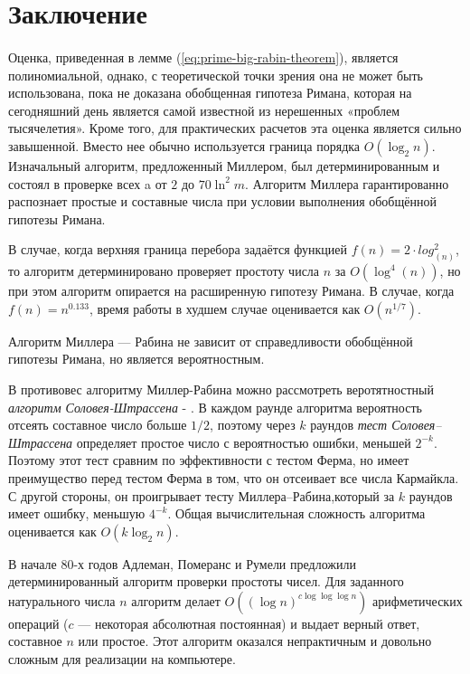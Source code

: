 \section{Заключение}

\paragraph{} Оценка, приведенная в лемме (\ref{eq:prime-big-rabin-theorem}), является полиномиальной, однако, с теоретической точки зрения она не может быть использована, пока не доказана обобщенная гипотеза Римана, которая на сегодняшний день является самой известной из нерешенных «проблем тысячелетия». Кроме того, для практических расчетов эта оценка является сильно завышенной. Вместо нее обычно используется граница порядка $O(\log_{2}{n})$. Изначальный алгоритм, предложенный Миллером, был детерминированным и состоял в проверке всех a от $2$ до $70 \ln^{2}m$. Алгоритм Миллера гарантированно распознает простые и составные числа при условии выполнения обобщённой гипотезы Римана. 

  В случае, когда верхняя граница перебора задаётся функцией $f(n)=2 \cdot log^{2}_(n)$, то алгоритм детерминировано проверяет простоту числа $n$ за
$O(\log^{4}(n))$, но при этом алгоритм опирается на расширенную гипотезу Римана. В случае, когда $f(n)=n^{0.133}$, время работы в худшем случае оценивается как $O(n^{1/7})$.

  Алгоритм Миллера — Рабина не зависит от справедливости обобщённой гипотезы Римана, но является вероятностным.

  В противовес алгоритму Миллер-Рабина можно рассмотреть веротятностный \textit{алгоритм Соловея-Штрассена} - 
\cite[Глава 11.5, страница 47]{cherem02}. В каждом раунде алгоритма вероятность отсеять составное число больше $1/2$, поэтому через $k$ раундов 
\textit{тест Соловея–Штрассена} определяет простое число с вероятностью ошибки, меньшей $2^{-k}$. Поэтому этот тест сравним по эффективности с 
тестом Ферма, но имеет преимущество перед тестом Ферма в том, что он отсеивает все числа Кармайкла. С другой стороны, он проигрывает тесту 
Миллера–Рабина,который за $k$ раундов имеет ошибку, меньшую $4^{-k}$. Общая вычислительная сложность алгоритма оценивается как $O(k \log_{2} n)$.

  В начале 80-х годов Адлеман, Померанс и Румели предложили детерминированный алгоритм проверки простоты чисел. Для заданного
натурального числа $n$ алгоритм делает $O((\log n)^{c \log \log \log n})$ арифметических операций ($c$ — некоторая абсолютная постоянная) и выдает верный
ответ, составное $n$ или простое. Этот алгоритм оказался непрактичным и довольно сложным для реализации на компьютере.

